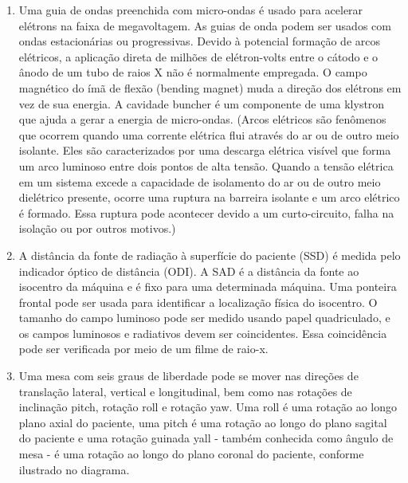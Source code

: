 \documentclass[11pt,a4paper]{article}
\begin{document}
\begin{enumerate}
        \item Uma guia de ondas preenchida com micro-ondas é usado para acelerar elétrons na faixa de megavoltagem. As guias de onda podem ser usados com ondas estacionárias ou progressivas. Devido à potencial formação de arcos elétricos, a aplicação direta de milhões de elétron-volts entre o cátodo e o ânodo de um tubo de raios X não é normalmente empregada. O campo magnético do ímã de flexão (bending magnet) muda a direção dos elétrons em vez de sua energia. A cavidade buncher é um componente de uma klystron que ajuda a gerar a energia de micro-ondas. (Arcos elétricos são fenômenos que ocorrem quando uma corrente elétrica flui através do ar ou de outro meio isolante. Eles são caracterizados por uma descarga elétrica visível que forma um arco luminoso entre dois pontos de alta tensão. Quando a tensão elétrica em um sistema excede a capacidade de isolamento do ar ou de outro meio dielétrico presente, ocorre uma ruptura na barreira isolante e um arco elétrico é formado. Essa ruptura pode acontecer devido a um curto-circuito, falha na isolação ou por outros motivos.)
        
        \item A distância da fonte de radiação à superfície do paciente (SSD) é medida pelo indicador óptico de distância (ODI). A SAD é a distância da fonte ao isocentro da máquina e é fixo para uma determinada máquina. Uma ponteira frontal pode ser usada para identificar a localização física do isocentro. O tamanho do campo luminoso pode ser medido usando papel quadriculado, e os campos luminosos e radiativos devem ser coincidentes. Essa coincidência pode ser verificada por meio de um filme de raio-x.
        
        \item Uma mesa com seis graus de liberdade pode se mover nas direções de translação lateral, vertical e longitudinal, bem como nas rotações de inclinação pitch, rotação roll e rotação yaw. Uma roll é uma rotação ao longo plano axial do paciente, uma pitch é uma rotação ao longo do plano sagital do paciente e uma rotação guinada yall - também conhecida como ângulo de mesa - é uma rotação ao longo do plano coronal do paciente, conforme ilustrado no diagrama.
        
        \begin{center}
        \end{center}


\end{enumerate}
\end{document}
